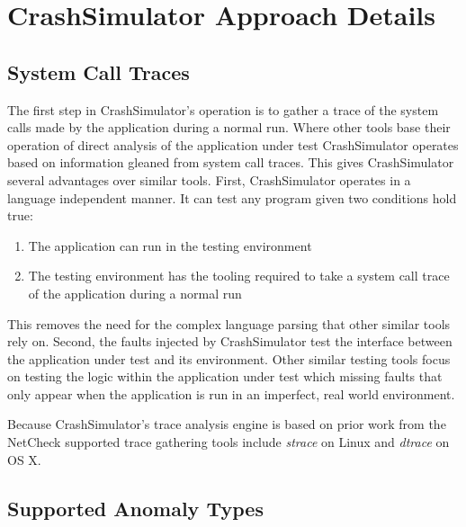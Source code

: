 \section{CrashSimulator Approach Details}

    \subsection{System Call Traces}

        The first step in CrashSimulator's operation is to gather a trace of the system calls made by the application
        during a normal run. Where other tools base their operation of direct analysis of the application under test
        CrashSimulator operates based on information gleaned from system call traces. This gives CrashSimulator several
        advantages over similar tools. First, CrashSimulator operates in a language independent manner. It can test any
        program given two conditions hold true:

        \begin{enumerate}
            \item{The application can run in the testing environment}
            \item{The testing environment has the tooling required to take a system call trace of the application during
            a normal run}
        \end{enumerate}

        This removes the need for the complex language parsing that other similar tools rely on. Second, the faults
        injected by CrashSimulator test the interface between the application under test and its environment. Other
        similar testing tools focus on testing the logic within the application under test which missing faults that
        only appear when the application is run in an imperfect, real world environment.

        Because CrashSimulator's trace analysis engine is based on prior work from the NetCheck supported trace
        gathering tools include \emph{strace} on Linux and \emph{dtrace} on OS X.


    \subsection{Supported Anomaly Types}


